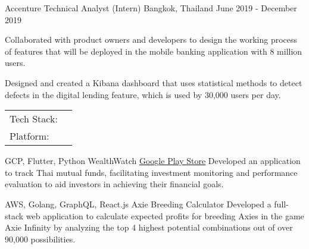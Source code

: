 \documentclass[]{awesome-cv}
\begin{document}
\begin{cventries}
	\cventry
	{Accenture}
	{Technical Analyst (Intern)}
	{Bangkok, Thailand}
	{June 2019 - December 2019}
	{\begin{cvitems}
			\item {Collaborated with product owners and developers to design the working process\\ of features that will be deployed in the mobile banking application with 8 million users.}
			\item {Designed and created a Kibana dashboard that uses statistical methods to detect\\ defects in the digital lending feature, which is used by 30,000 users per day.}
		\end{cvitems}}
\end{cventries}

\vspace{-5mm}
\begin{cventries}
	\cventry
	{}
	{\def\arraystretch{1.15}{\begin{tabular}{ p{2.5cm} l }
				Tech Stack: & {\skill{ Kotlin, Flutter, Golang, TypeScript, node.js, React.js, PostgreSQL, MongoDB}} \\
				Platform:   & {\skill{ AWS, GCP, OpenShift, Kubernetes, Docker, Control-M}}                          \\
			\end{tabular}}}
	{}
	{}
	{}
\end{cventries}

\vspace{-9mm}
\begin{cventries}
	\cventry
	{GCP, Flutter, Python}
	{WealthWatch}
	{\href{https://play.google.com/store/apps/details?id=com.wealthwatch.portfolioapp}{Google Play Store}}
	{}
	{Developed an application to track Thai mutual funds, facilitating investment monitoring and performance evaluation to aid investors in achieving their financial goals.}
\end{cventries}
\begin{cventries}
	\cventry
	{AWS, Golang, GraphQL, React.js}
	{Axie Breeding Calculator}
	{}
	{}
	{Developed a full-stack web application to calculate expected profits for breeding Axies in the game Axie Infinity by analyzing the top 4 highest potential combinations out of over 90,000 possibilities.}
\end{cventries}
\end{document}
